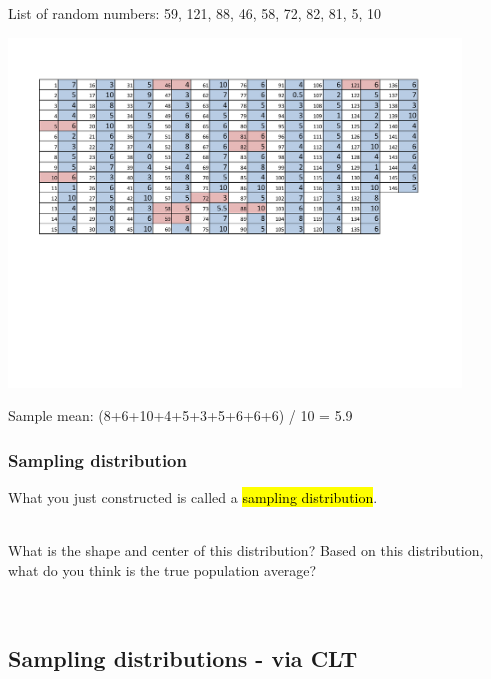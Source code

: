 \begin{frame}[fragile]
\frametitle{}

 List of random numbers: 59, 121,  88,  46,  58,  72,  82,  81,   5,  10 \\

\begin{center}
\includegraphics[width=0.9\textwidth]{5-1_var_in_est/figures/no_drinks_drunk/no_drinks_drunk_marked} 
\end{center}

\pause

Sample mean: (8+6+10+4+5+3+5+6+6+6) / 10 = 5.9

\end{frame}



\begin{frame}[fragile]
\frametitle{Sampling distribution}

What you just constructed is called a \hl{sampling distribution}.

\pause

$\:$ \\
\dq
{What is the shape and center of this distribution? Based on this distribution, what do you think is the true population average?}

$\:$ \\

\end{frame}



\subsection{Sampling distributions - via CLT}

